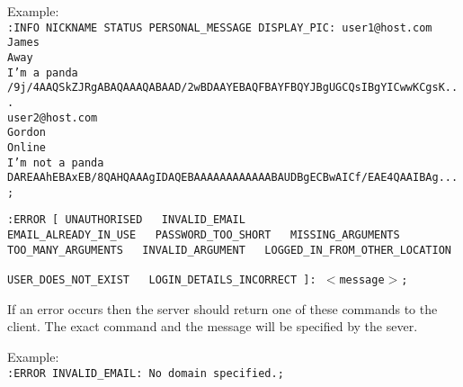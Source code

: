 Example: \\

\texttt{:INFO NICKNAME STATUS PERSONAL\_MESSAGE DISPLAY\_PIC: user1@host.com \\
James \\
Away \\
I’m a panda \\
/9j/4AAQSkZJRgABAQAAAQABAAD/2wBDAAYEBAQFBAYFBQYJBgUGCQsIBgYICwwKCgsK... \\
user2@host.com \\
Gordon \\
Online \\
I’m not a panda \\
DAREAAhEBAxEB/8QAHQAAAgIDAQEBAAAAAAAAAAAABAUDBgECBwAICf/EAE4QAAIBAg...;}

\texttt{:ERROR [ UNAUTHORISED \ \vline \ INVALID\_EMAIL \ \vline \ \\ EMAIL\_ALREADY\_IN\_USE \ \vline \ PASSWORD\_TOO\_SHORT \ \vline \ MISSING\_ARGUMENTS \ \vline \ \\ TOO\_MANY\_ARGUMENTS \ \vline \ INVALID\_ARGUMENT \ \vline \ LOGGED\_IN\_FROM\_OTHER\_LOCATION \ \vline \ \\ USER\_DOES\_NOT\_EXIST \ \vline \ LOGIN\_DETAILS\_INCORRECT ]: $<$message$>$;}

If an error occurs then the server should return one of these commands to the client. The exact command and the message will be specified by the sever.

Example: \\
\texttt{:ERROR INVALID\_EMAIL: No domain specified.;}
